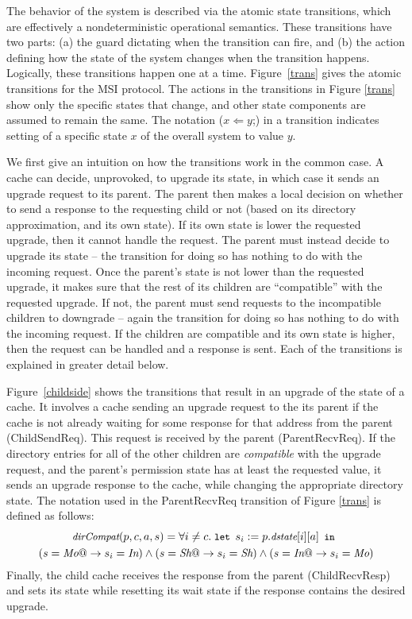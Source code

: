 The behavior of the system is described via the atomic state transitions, which
are effectively a nondeterministic operational semantics. These transitions
have two parts: (a) the guard dictating when the transition can fire, and (b)
the action defining how the state of the system changes when the transition
happens. Logically, these transitions happen one at a time.  Figure~\ref{trans}
gives the atomic transitions for the MSI protocol.  The actions in the
transitions in Figure \ref{trans} show only the specific states that change,
and other state components are assumed to remain the same.  The notation ($x
\Leftarrow y$;) in a transition indicates setting of a specific state $x$ of
the overall system to value $y$.

We first give an intuition on how the transitions work in the common case.
A cache can decide, unprovoked, to upgrade its state,
in which case it sends an upgrade request to its parent. The parent then makes
a local decision on whether to send a response to the requesting child or not
(based on its directory approximation, and its own state). If its own state is
lower the requested upgrade, then it cannot handle the request. The parent
must instead decide to upgrade its state -- the transition for doing so has
nothing to do with the incoming request.  Once the parent's state is not lower
than the requested upgrade, it makes sure that the rest of its children are
``compatible'' with the requested upgrade. If not, the parent must send
requests to the incompatible children to downgrade -- again the transition for
doing so has nothing to do with the incoming request. If the children are
compatible and its own state is higher, then the request can be handled and a
response is sent. Each of the transitions is explained in greater detail below.

Figure~\ref{childside} shows the transitions that result in an upgrade of the
state of a cache. It involves a cache sending an upgrade request to the its
parent if the cache is not already waiting for some response for that address
from the parent (ChildSendReq). This request is received by the parent
(ParentRecvReq). If the directory entries for all of the other children are
\emph{compatible} with the upgrade request, and the parent's permission state has
at least the requested value, it sends an upgrade response to the cache, while
changing the appropriate directory state. The notation \compat{} used in
the ParentRecvReq transition of Figure \ref{trans} is defined as follows:
\begin{multline*}
\small
\compat(p, c, a, s) = \forall i \ne c. \;
\mylet s_i := p.\dstate[i][a] \myin\\
 (s = \Mo @-> s_i = \In) \wedge (s = \Sh @-> s_i = \Sh) \wedge (s = \In @-> s_i = \Mo)
\end{multline*}
Finally, the child cache receives the response from the parent (ChildRecvResp)
and sets its state while resetting its wait state if the response contains the
desired upgrade.

